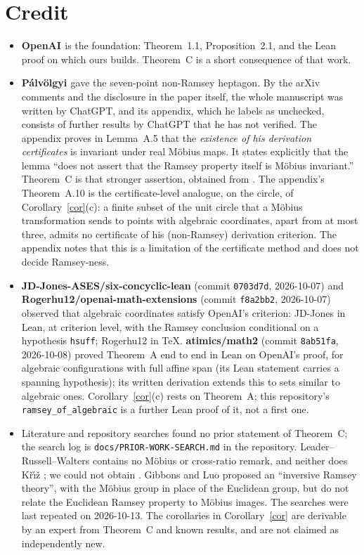\documentclass[11pt]{amsart}
\newcommand{\Kriz}{K\v{r}\'{\i}\v{z}}
\theoremstyle{plain}
\theoremstyle{definition}
\begin{document}
\section{Credit}\label{sec:credit}

\begin{itemize}
\item \textbf{OpenAI \cite{OAI172}} is the foundation: Theorem~1.1, Proposition~2.1, and the Lean
proof on which ours builds. Theorem~C is a short consequence of that work.
\item \textbf{P\'alv\"olgyi \cite{Palvolgyi}} gave the seven-point non-Ramsey heptagon. By the
arXiv comments and the disclosure in the paper itself, the whole manuscript was written by
ChatGPT, and its appendix, which he labels as unchecked, consists of further results by ChatGPT
that he has not verified. The appendix proves in Lemma~A.5 that the
\emph{existence of his derivation certificates} is invariant under real M\"obius maps. It states
explicitly that the lemma ``does not assert that the Ramsey property itself is M\"obius
invariant.'' Theorem~C is that stronger assertion, obtained from \cite{OAI172}. The appendix's
Theorem~A.10 is the certificate-level analogue, on the circle, of Corollary~\ref{cor}(c): a
finite subset of the unit circle that a M\"obius transformation sends to points with algebraic
coordinates, apart from at most three, admits no certificate of his (non-Ramsey) derivation
criterion. The appendix notes that this is a limitation of the certificate method and does not
decide Ramsey-ness.
\item \textbf{JD-Jones-ASES/six-concyclic-lean} \cite{JDJones} (commit \texttt{0703d7d},
2026-10-07) and \textbf{Rogerhu12/openai-math-extensions} \cite{Rogerhu} (commit
\texttt{f8a2bb2}, 2026-10-07) observed that algebraic coordinates satisfy OpenAI's criterion:
JD-Jones in Lean, at criterion level, with the Ramsey conclusion conditional on a hypothesis
\texttt{hsuff}; Rogerhu12 in \TeX. \textbf{atimics/math2} \cite{Atimics} (commit \texttt{8ab51fa},
2026-10-08) proved Theorem~A end to end in Lean on OpenAI's proof, for algebraic configurations
with full affine span (its Lean statement carries a spanning hypothesis); its written derivation
extends this to sets similar to algebraic ones. Corollary~\ref{cor}(c) rests on Theorem~A; this
repository's \texttt{ramsey\_of\_algebraic} is a further Lean proof of it, not a first one.
\item Literature and repository searches found no prior statement of Theorem~C; the search log
is \texttt{docs/PRIOR-WORK-SEARCH.md} in the repository. Leader--Russell--Walters \cite{LRW12}
contains no M\"obius or cross-ratio remark, and neither does \Kriz{} \cite{Kriz91}; we could not
obtain \cite{Kriz92}. Gibbons and Luo \cite{GibbonsLuo} proposed an ``inversive Ramsey theory'',
with the M\"obius group in place of the Euclidean group, but do not relate the Euclidean Ramsey
property to M\"obius images. The searches were last repeated on 2026-10-13. The corollaries in
Corollary~\ref{cor} are derivable by an expert from Theorem~C and known results, and are not
claimed as independently new.
\end{itemize}
\end{document}

